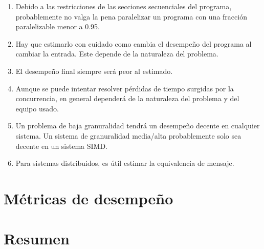 \begin{enumerate}
    \item Debido a las restricciones de las secciones secuenciales del programa,
    probablemente no valga la pena paralelizar un programa con una fracción
    paralelizable menor a 0.95.
    
    \item Hay que estimarlo con cuidado como cambia el desempeño del programa
    al cambiar la entrada. Este depende de la naturaleza del problema.
    
    \item El desempeño final siempre será peor al estimado.
    
    \item Aunque se puede intentar resolver pérdidas de tiempo surgidas por la
    concurrencia, en general dependerá de la naturaleza del problema y del
    equipo usado.
    
    \item Un problema de baja granuralidad tendrá un desempeño decente en
    cualquier sistema. Un sistema de granuralidad media/alta probablemente solo
    sea decente en un sistema SIMD.
    
    \item Para sistemas distribuidos, es útil estimar la equivalencia de
    mensaje.
    
\end{enumerate}

\section{Métricas de desempeño}

\section{Resumen}